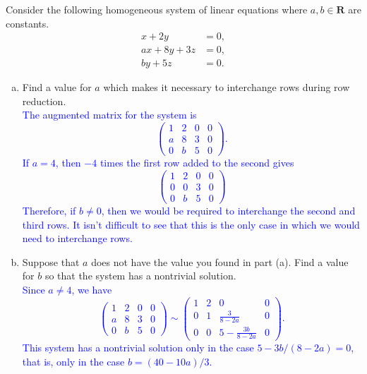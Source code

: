 \documentclass[a4paper,11pt]{article}
\newcommand{\R}{\mathbf{R}}
\newcommand{\BB}[1]{\textcolor{blue}{#1}}
\begin{document}
 Consider the following homogeneous system of
linear equations where $a,b \in \R$ are constants.
\begin{align*}
  x+2y &= 0, \\
  ax+8y+3z &= 0, \\
  by+5z &= 0.
\end{align*}
\begin{enumerate}[(a)]
\item Find a value for $a$ which makes it necessary to interchange rows during
  row reduction. \\

  \BB{The augmented matrix for the system is
    \[
      \left(
        \begin{array}{rrr|r}
          1 & 2 & 0 & 0 \\
          a & 8 & 3 & 0 \\
          0 & b & 5 & 0
        \end{array}
      \right).
    \]
    If $a=4$, then $-4$ times the first row added to the second gives
    \[
      \left(
        \begin{array}{rrr|r}
          1 & 2 & 0 & 0 \\
          0 & 0 & 3 & 0 \\
          0 & b & 5 & 0
        \end{array}
      \right)
    \]
    Therefore, if $b \neq 0$, then we would be required to interchange the
    second and third rows. It isn't difficult to see that this is the only case
    in which we would need to interchange rows. \\
  }

\item Suppose that $a$ does not have the value you found in part (a). Find a
  value for $b$ so that the system has a nontrivial solution. \\

  \BB{Since $a \neq 4$, we have
    \[
      \left(
        \begin{array}{rrr|r}
          1 & 2 & 0 & 0 \\
          a & 8 & 3 & 0 \\
          0 & b & 5 & 0
        \end{array}
      \right)\sim
      \left(
        \begin{array}{rrr|r}
          1 & 2 & 0 & 0 \\
          0 & 1 & \frac{3}{8-2a} & 0 \\
          0 & 0 & 5-\frac{3b}{8-2a} & 0
        \end{array}
      \right).
    \]
    This system has a nontrivial solution only in the case $5-3b/(8-2a)=0$, that
    is, only in the case $b=(40-10a)/3$. \\
  }
  

\end{enumerate}
\end{document}
